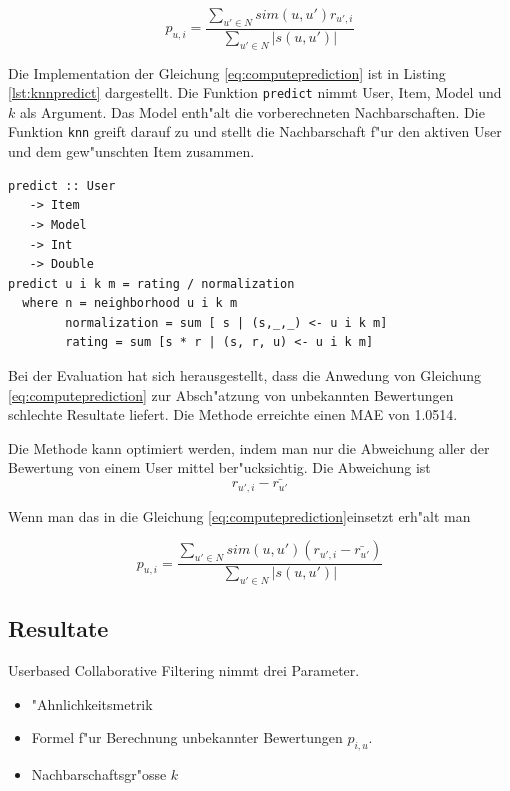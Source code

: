 \documentclass[a4paper, 12pt]{article}
\begin{document}
\begin{equation}
  \label{eq:computeprediction}
  p_{u,i} = \frac{\sum_{u' \in N}{sim(u,u') r_{u',i}}}{\sum_{u' \in N}{|s(u,u')|}}
\end{equation}

Die Implementation der Gleichung \ref{eq:computeprediction} ist in Listing \ref{lst:knnpredict} dargestellt. Die Funktion \verb|predict| nimmt User, Item, Model und $k$ als Argument. Das Model enth"alt die vorberechneten Nachbarschaften. Die Funktion \verb|knn| greift darauf zu und stellt die Nachbarschaft f"ur den aktiven User und dem gew"unschten Item zusammen.

\begin{lstlisting}[caption=Berechnung von $p_{u,i}$, label=lst:knnpredict]
  predict :: User
   -> Item
   -> Model
   -> Int
   -> Double
predict u i k m = rating / normalization
  where n = neighborhood u i k m
        normalization = sum [ s | (s,_,_) <- u i k m]
        rating = sum [s * r | (s, r, u) <- u i k m]
\end{lstlisting}

Bei der Evaluation hat sich herausgestellt, dass die Anwedung von Gleichung \ref{eq:computeprediction} zur Absch"atzung von unbekannten Bewertungen schlechte Resultate liefert. Die Methode erreichte einen MAE von 1.0514. 

Die Methode kann optimiert werden, indem man nur die Abweichung aller der Bewertung von einem User mittel ber"ucksichtig. Die Abweichung ist
\begin{equation}
  \label{eq:dev2}
r_{u',i} - \bar{r_{u'}}
\end{equation}

Wenn man das in die Gleichung \ref{eq:computeprediction}einsetzt erh"alt man

\begin{equation}
  \label{eq:optcomputeprediction}
  p_{u,i} = \frac{\sum_{u' \in N}{sim(u,u') (r_{u',i} - \bar{r_{u'}})}}{\sum_{u' \in N}{|s(u,u')|}}
\end{equation}

\subsection{Resultate}
\label{sec:userbasedresults}

Userbased Collaborative Filtering nimmt drei Parameter.
\begin{itemize}
\item "Ahnlichkeitsmetrik
\item Formel f"ur Berechnung unbekannter Bewertungen $p_{i,u}$.
\item Nachbarschaftsgr"osse $k$
\end{itemize}
\end{document}
